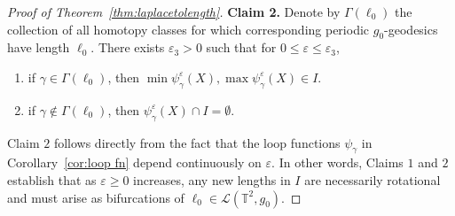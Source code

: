 \documentclass[11pt,letterpaper,oneside]{amsart}
\newcommand{\T}{\mathbb{T}}
\theoremstyle{definition}
\theoremstyle{remark}
\newcommand{\eps}{\varepsilon}
\theoremstyle{definition}
\theoremstyle{remark}
\newcommand{\CL}{\mathcal{L}}
\begin{document}
\begin{proof}[Proof of Theorem~\ref{thm:laplacetolength}]
{    \medskip
    
    \noindent \textbf{Claim 2.} Denote by $\Gamma(\ell_0)$ the collection of all homotopy classes for which corresponding periodic $g_0$-geodesics have length $\ell_0$. There exists $\eps_3 > 0$ such that for $0 \leq \eps \leq \eps_3$,
    \begin{enumerate}
        \item if $\gamma \in \Gamma(\ell_0)$, then $\min \psi_{\gamma}^\eps(X), \max \psi_\gamma^\eps(X) \in I$.

        \item if $\gamma \notin \Gamma(\ell_0)$, then $\psi_\gamma^\eps(X) \cap I = \emptyset$.
    \end{enumerate}
}
    \medskip
    
    {Claim $2$ follows directly from the fact that the loop functions $\psi_\gamma$ in Corollary~\ref{cor:loop fn} depend continuously on $\eps$. In other words, Claims $1$ and $2$ establish that as $\eps \geq 0$ increases, any new lengths in $I$ are necessarily rotational and must arise as bifurcations of $\ell_0 \in \CL(\T^2, g_0)$.}

    \medskip
    

\end{proof}
\end{document}
